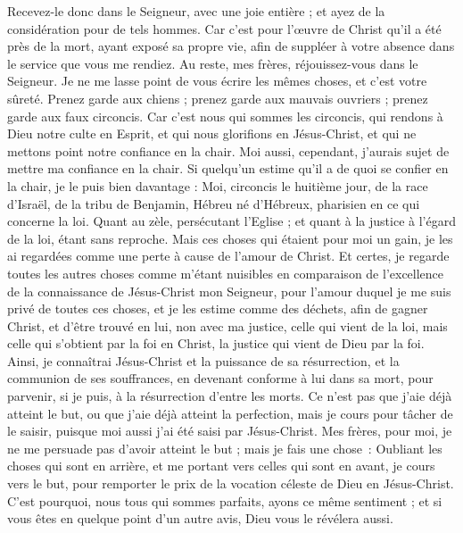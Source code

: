 \begin{multicols}{2}
Recevez-le donc dans le Seigneur, avec une joie entière ; et ayez de la considération pour de tels hommes.
Car c’est pour l’œuvre de Christ qu’il a été près de la mort, ayant exposé sa propre vie, afin de suppléer à votre absence dans le service que vous me rendiez.
\VerseOne{}Au reste, mes frères, réjouissez-vous dans le Seigneur. Je ne me lasse point de vous écrire les mêmes choses, et c’est votre sûreté.
Prenez garde aux chiens ; prenez garde aux mauvais ouvriers ; prenez garde aux faux circoncis.
Car c'est nous qui sommes les circoncis, qui rendons à Dieu notre culte en Esprit, et qui nous glorifions en Jésus-Christ, et qui ne mettons point notre confiance en la chair.
Moi aussi, cependant, j’aurais sujet de mettre ma confiance en la chair. Si quelqu'un estime qu'il a de quoi se confier en la chair, je le puis bien davantage :
Moi, circoncis le huitième jour, de la race d'Israël, de la tribu de Benjamin, Hébreu né d'Hébreux, pharisien en ce qui concerne la loi.
Quant au zèle, persécutant l'Eglise ; et quant à la justice à l’égard de la loi, étant sans reproche.
Mais ces choses qui étaient pour moi un gain, je les ai regardées comme une perte à cause de l'amour de Christ.
Et certes, je regarde toutes les autres choses comme m'étant nuisibles en comparaison de l'excellence de la connaissance de Jésus-Christ mon Seigneur, pour l'amour duquel je me suis privé de toutes ces choses, et je les estime comme des déchets, afin de gagner Christ,
et d’être trouvé en lui, non avec ma justice, celle qui vient de la loi, mais celle qui s’obtient par la foi en Christ, la justice qui vient de Dieu par la foi.
Ainsi, je connaîtrai Jésus-Christ et la puissance de sa résurrection, et la communion de ses souffrances, en devenant conforme à lui dans sa mort, pour parvenir,
si je puis, à la résurrection d’entre les morts.
Ce n’est pas que j'aie déjà atteint le but, ou que j’aie déjà atteint la perfection, mais je cours pour tâcher de le saisir, puisque moi aussi j'ai été saisi par Jésus-Christ.
Mes frères, pour moi, je ne me persuade pas d'avoir atteint le but ;
mais je fais une chose : Oubliant les choses qui sont en arrière, et me portant vers celles qui sont en avant, je cours vers le but, pour remporter le prix de la vocation céleste de Dieu en Jésus-Christ.
C'est pourquoi, nous tous qui sommes parfaits, ayons ce même sentiment ; et si vous êtes en quelque point d’un autre avis, Dieu vous le révélera aussi.

\end{multicols}

